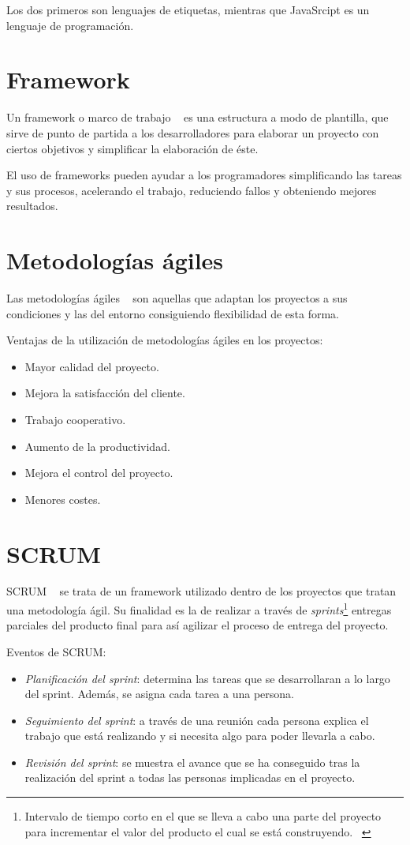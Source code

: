 Los dos primeros son lenguajes de etiquetas, mientras que JavaSrcipt es un lenguaje de programación.

\section{Framework}
Un framework o marco de trabajo ~\cite{wiki:framework} es una estructura a modo de plantilla, que sirve de punto de partida a los desarrolladores para elaborar un proyecto con ciertos objetivos y simplificar la elaboración de éste.

El uso de frameworks pueden ayudar a los programadores simplificando las tareas y sus procesos, acelerando el trabajo, reduciendo fallos y obteniendo mejores resultados.

\section{Metodologías ágiles}
Las metodologías ágiles ~\cite{wiki:metodologias_agiles} son aquellas que adaptan los proyectos a sus condiciones y las del entorno consiguiendo flexibilidad de esta forma.

Ventajas de la utilización de metodologías ágiles en los proyectos:
\begin{itemize}
    \item Mayor calidad del proyecto.
    \item Mejora la satisfacción del cliente.
    \item Trabajo cooperativo.
    \item Aumento de la productividad.
    \item Mejora el control del proyecto.
    \item Menores costes.
\end{itemize}

\section{SCRUM}
SCRUM ~\cite{wiki:scrum} se trata de un framework utilizado dentro de los proyectos que tratan una metodología ágil. Su finalidad es la de realizar a través de \textit{sprints}\footnote{Intervalo de tiempo corto en el que se lleva a cabo una parte del proyecto para incrementar el valor del producto el cual se está construyendo. ~\cite{wiki:sprint}} entregas parciales del producto final para así agilizar el proceso de entrega del proyecto.

Eventos de SCRUM:
\begin{itemize}
    \item \textit{Planificación del sprint}: determina las tareas que se desarrollaran a lo largo del sprint. Además, se asigna cada tarea a una persona.
    \item \textit{Seguimiento del sprint}: a través de una reunión cada persona explica el trabajo que está realizando y si necesita algo para poder llevarla a cabo.
    \item \textit{Revisión del sprint}: se muestra el avance que se ha conseguido tras la realización del sprint a todas las personas implicadas en el proyecto.
\end{itemize}

